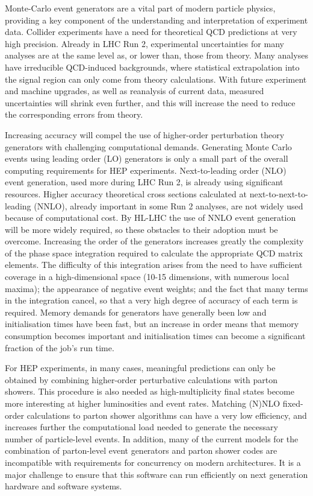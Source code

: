 \documentclass[12pt,a4paper]{article}
\begin{document}
Monte-Carlo event generators are a vital part of modern particle
physics, providing a key component of the understanding and
interpretation of experiment data. Collider experiments have a need for
theoretical QCD predictions at very high precision. Already in LHC Run
2, experimental uncertainties for many analyses are at the same level as,
or lower than, those from theory. Many analyses have irreducible
QCD-induced backgrounds, where statistical extrapolation into the signal
region can only come from theory calculations. With future experiment
and machine upgrades, as well as reanalysis of current data, measured
uncertainties will shrink even further, and this will increase the need
to reduce the corresponding errors from theory.

Increasing accuracy will compel the use of higher-order perturbation
theory generators with challenging computational demands. Generating
Monte Carlo events using leading order (LO) generators is only a small
part of the overall computing requirements for HEP experiments.
Next-to-leading order (NLO) event generation, used more during LHC Run
2, is already using significant resources. Higher accuracy
theoretical cross sections calculated at next-to-next-to-leading (NNLO),
already important in some Run 2 analyses, are not widely used
because of computational cost. By HL-LHC the use of NNLO event
generation will be more widely required, so these obstacles to their
adoption must be overcome.
Increasing the order of the generators increases greatly the complexity
of the phase space integration required to calculate the appropriate QCD
matrix elements. The difficulty of this integration arises from the need
to have sufficient coverage in a high-dimensional space (10-15
dimensions, with numerous local maxima); the appearance of negative event
weights; and the fact that many terms in the integration cancel, so that
a very high degree of accuracy of each term is required. Memory demands
for generators have generally been low and initialisation times have
been fast, but an increase in order means that memory consumption
becomes important and initialisation times can become a significant 
fraction of the job's run time.

For HEP experiments, in many cases, meaningful predictions can only be
obtained by combining higher-order perturbative calculations with parton
showers. This procedure is also needed as high-multiplicity final states
become more interesting at higher luminosities and event rates. Matching
(N)NLO fixed-order calculations to parton shower algorithms can have a
very low efficiency, and increases further the computational load needed
to generate the necessary number of particle-level events. In addition,
many of the current models for the combination of parton-level event
generators and parton shower codes are incompatible with requirements
for concurrency on modern architectures. It is a major challenge to
ensure that this software can run efficiently on next generation
hardware and software systems.
\end{document}
